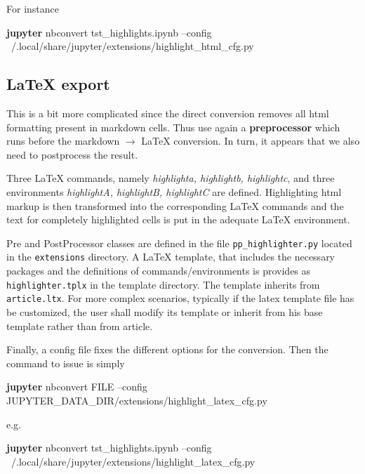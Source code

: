 \documentclass{article}
\newenvironment{Shaded}{}{}
\newcommand{\KeywordTok}[1]{\textcolor[rgb]{0.00,0.44,0.13}{\textbf{{#1}}}}
\newcommand{\NormalTok}[1]{{#1}}
\begin{document}
For instance

\begin{Shaded}
\begin{Highlighting}[]
\KeywordTok{jupyter} \NormalTok{nbconvert tst_highlights.ipynb  --config ~/.local/share/jupyter/extensions/highlight_html_cfg.py }
\end{Highlighting}
\end{Shaded}

    \subsection{LaTeX export}\label{latex-export}

This is a bit more complicated since the direct conversion removes all
html formatting present in markdown cells. Thus use again a
\textbf{preprocessor} which runs before the markdown \(\rightarrow\)
LaTeX conversion. In turn, it appears that we also need to postprocess
the result.

Three LaTeX commands, namely \emph{highlighta, highlightb, highlightc},
and three environments \emph{highlightA, highlightB, highlightC} are
defined. Highlighting html markup is then transformed into the
corresponding LaTeX commands and the text for completely highlighted
cells is put in the adequate LaTeX environment.

Pre and PostProcessor classes are defined in the file
\texttt{pp\_highlighter.py} located in the \texttt{extensions}
directory. A LaTeX template, that includes the necessary packages and
the definitions of commands/environments is provides as
\texttt{highlighter.tplx} in the template directory. The template
inherits from \texttt{article.ltx}. For more complex scenarios,
typically if the latex template file has be customized, the user shall
modify its template or inherit from his base template rather than from
article.

Finally, a config file fixes the different options for the conversion.
Then the command to issue is simply

\begin{Shaded}
\begin{Highlighting}[]
 \KeywordTok{jupyter} \NormalTok{nbconvert FILE  --config JUPYTER_DATA_DIR/extensions/highlight_latex_cfg.py }
\end{Highlighting}
\end{Shaded}

e.g.

\begin{Shaded}
\begin{Highlighting}[]
\KeywordTok{jupyter} \NormalTok{nbconvert tst_highlights.ipynb  --config ~/.local/share/jupyter/extensions/highlight_latex_cfg.py }
\end{Highlighting}
\end{Shaded}
\end{document}
